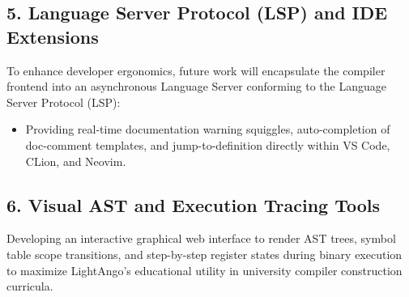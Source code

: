 \subsection{5. Language Server Protocol (LSP) and IDE Extensions}
To enhance developer ergonomics, future work will encapsulate the compiler frontend into an asynchronous Language Server conforming to the Language Server Protocol (LSP):
\begin{itemize}
    \item Providing real-time documentation warning squiggles, auto-completion of doc-comment templates, and jump-to-definition directly within VS Code, CLion, and Neovim.
\end{itemize}

\subsection{6. Visual AST and Execution Tracing Tools}
Developing an interactive graphical web interface to render AST trees, symbol table scope transitions, and step-by-step register states during binary execution to maximize LightAngo's educational utility in university compiler construction curricula.
\newpage
